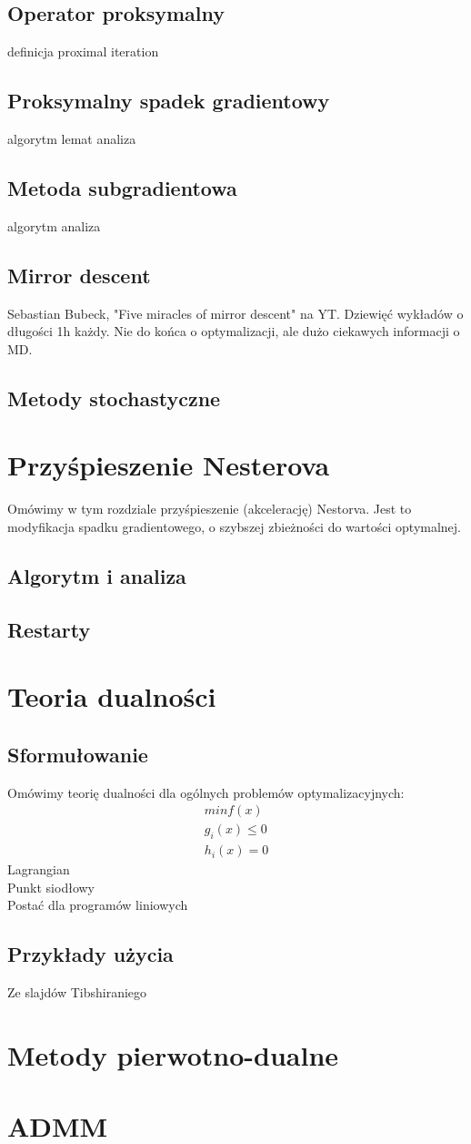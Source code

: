 \documentclass[10pt,a4paper,draft]{report}
\begin{document}
\section{Operator proksymalny}
definicja
proximal iteration

\section{Proksymalny spadek gradientowy}
algorytm
lemat
analiza
\section{Metoda subgradientowa}
algorytm
analiza

\section{Mirror descent}

Sebastian Bubeck, "Five miracles of mirror descent" na YT. Dziewięć wykładów o długości 1h każdy. Nie do końca o optymalizacji, ale dużo ciekawych informacji o MD.

\section{Metody stochastyczne}

\chapter{Przyśpieszenie Nesterova}
Omówimy w tym rozdziale przyśpieszenie (akcelerację) Nestorva. Jest to modyfikacja spadku gradientowego, o szybszej zbieżności do wartości optymalnej.
\section{Algorytm i analiza}

\section{Restarty}


\chapter{Teoria dualności}
\section{Sformułowanie}
Omówimy teorię dualności dla ogólnych problemów optymalizacyjnych:
\[
\begin{array}{c}
min f(x) \\
g_i(x) \leq 0 \\
h_i(x) = 0
\end{array}
\]
Lagrangian \\
Punkt siodłowy \\
Postać dla programów liniowych
\section{Przykłady użycia}
Ze slajdów Tibshiraniego

\chapter{Metody pierwotno-dualne}

\chapter{ADMM}
\end{document}
